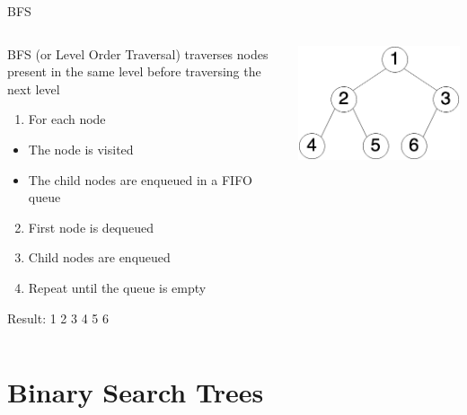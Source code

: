 \documentclass[
  ignorenonframetext,
]{beamer}
\providecommand{\tightlist}{%
  \setlength{\itemsep}{0pt}\setlength{\parskip}{0pt}}\usepackage{longtable,booktabs,array}
\begin{document}
\begin{frame}{BFS}
\protect\hypertarget{bfs}{}
\begin{columns}[T]
\begin{column}{0.6\textwidth}
BFS (or Level Order Traversal) traverses nodes present in the same level
before traversing the next level

\begin{enumerate}
\tightlist
\item
  For each node
\end{enumerate}

\begin{itemize}
\item
  The node is visited
\item
  The child nodes are enqueued in a FIFO queue
\end{itemize}

\begin{enumerate}
\setcounter{enumi}{1}
\item
  First node is dequeued
\item
  Child nodes are enqueued
\item
  Repeat until the queue is empty
\end{enumerate}

Result: 1 2 3 4 5 6
\end{column}

\begin{column}{0.4\textwidth}
\includegraphics{images/tree-num.png}
\end{column}
\end{columns}
\end{frame}

\hypertarget{binary-search-trees}{%
\section{Binary Search Trees}\label{binary-search-trees}}
\end{document}

